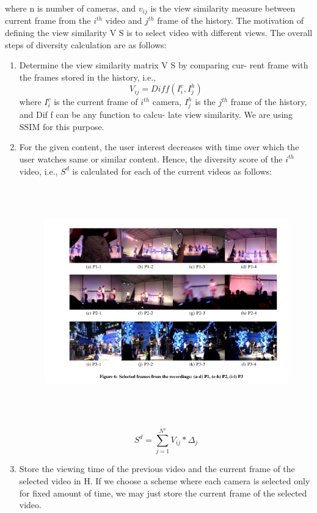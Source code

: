 \documentclass{sig-alternate}
\begin{document}
where n is number of cameras, and $v_{ij}$ is the view similarity
measure between current frame from the $i^{th}$ video and $j^{th}$ frame
of the history. The motivation of defining the view similarity V S is
to select video with different views. The overall steps of diversity
calculation are as follows:
 \begin{enumerate} 
\item Determine the view similarity matrix V S by comparing cur-
rent frame with the frames stored in the history, i.e.,
\[V_{ij} = Diff(I^c_i,I^h_j)\tag{15}\]
where $I^c_i$ is the current frame of $i^{th}$ camera, $I^h_j$ is the $j^{th}$
frame of the history, and Dif f can be any function to calcu-
late view similarity. We are using SSIM \cite{salas:seventeen} for this purpose.
\item For the given content, the user interest decreases with time
over which the user watches same or similar content. Hence,
the diversity score of the $i^{th}$ video, i.e., $S^{d}$ is calculated for
each of the current videos as follows:
\begin{figure}
  \includegraphics[width=\textwidth,height = 10cm]{five.pdf}
\end{figure}
\[S^d =\sum_{j=1}^{N^v}V_{ij}*\Delta_j\tag{16}\]
\item Store the viewing time of the previous video and the current
frame of the selected video in H. If we choose a scheme
where each camera is selected only for fixed amount of time,
we may just store the current frame of the selected video.


\end{enumerate}
\end{document}
